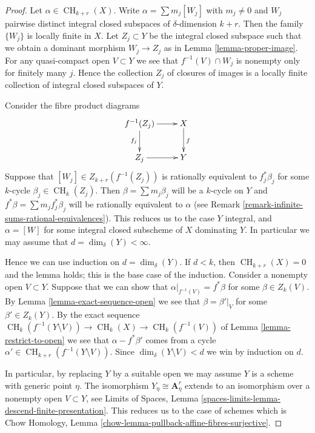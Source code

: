 \documentclass[10pt,a4paper]{amsart}
\theoremstyle{plain}
\theoremstyle{definition}
\theoremstyle{remark}
\numberwithin{equation}{subsection}
\def\CH{\mathop{\mathrm{CH}}\nolimits}
\begin{document}
\begin{proof}
Let $\alpha \in \CH_{k + r}(X)$. Write $\alpha = \sum m_j[W_j]$ with
$m_j \not = 0$ and $W_j$ pairwise distinct integral closed subspaces of
$\delta$-dimension $k + r$. Then the family $\{W_j\}$
is locally finite in $X$. Let $Z_j \subset Y$ be the integral
closed subspace such that we obtain a dominant morphism $W_j \to Z_j$
as in Lemma \ref{lemma-proper-image}. For any quasi-compact open
$V \subset Y$ we see that $f^{-1}(V) \cap W_j$
is nonempty only for finitely many $j$. Hence the
collection $Z_j$ of closures of images is a locally finite collection
of integral closed subspaces of $Y$.

\medskip\noindent
Consider the fibre product diagrams
$$
\xymatrix{
f^{-1}(Z_j) \ar[r] \ar[d]_{f_j} & X \ar[d]^f \\
Z_j \ar[r] & Y
}
$$
Suppose that $[W_j] \in Z_{k + r}(f^{-1}(Z_j))$
is rationally equivalent to $f_j^*\beta_j$ for some
$k$-cycle $\beta_j \in \CH_k(Z_j)$. Then
$\beta = \sum m_j \beta_j$ will be a $k$-cycle on $Y$
and $f^*\beta = \sum m_j f_j^*\beta_j$ will be rationally
equivalent to $\alpha$ (see
Remark \ref{remark-infinite-sums-rational-equivalences}).
This reduces us to the case $Y$ integral, and
$\alpha = [W]$ for some integral closed subscheme
of $X$ dominating $Y$. In particular we may
assume that $d = \dim_\delta(Y) < \infty$.

\medskip\noindent
Hence we can use induction on $d = \dim_\delta(Y)$.
If $d < k$, then $\CH_{k + r}(X) = 0$ and the lemma holds;
this is the base case of the induction.
Consider a nonempty open $V \subset Y$.
Suppose that we can show that $\alpha|_{f^{-1}(V)} = f^*\beta$
for some $\beta \in Z_k(V)$. By Lemma \ref{lemma-exact-sequence-open}
we see that
$\beta = \beta'|_V$ for some $\beta' \in Z_k(Y)$.
By the exact sequence
$\CH_k(f^{-1}(Y \setminus V)) \to \CH_k(X) \to \CH_k(f^{-1}(V))$
of Lemma \ref{lemma-restrict-to-open}
we see that $\alpha - f^*\beta'$ comes from
a cycle $\alpha' \in \CH_{k + r}(f^{-1}(Y \setminus V))$.
Since $\dim_\delta(Y \setminus V) < d$ we win by
induction on $d$.

\medskip\noindent
In particular, by replacing $Y$ by a suitable open we may assume
$Y$ is a scheme with generic point $\eta$. The isomorphism
$Y_\eta \cong \mathbf{A}^r_\eta$ extends to an isomorphism
over a nonempty open $V \subset Y$, see
Limits of Spaces, Lemma \ref{spaces-limits-lemma-descend-finite-presentation}.
This reduces us to the case of schemes which is
Chow Homology, Lemma \ref{chow-lemma-pullback-affine-fibres-surjective}.
\end{proof}
\end{document}
